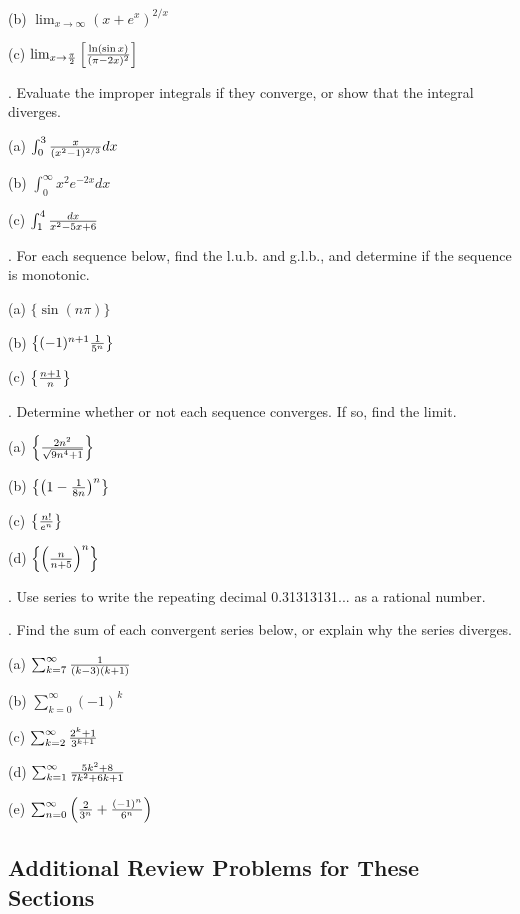 \documentclass[12pt]{article}
\begin{document}
\noindent (b) $\lim_{x \to \infty} (x + e^x)^{2/x}$

\noindent (c) $\lim_{x \to {{\pi}\over{2}}} \left [ {{\ln (\sin x)}\over{(\pi - 
2x)^2}} \right ]$

\bigskip
{}.  Evaluate the improper integrals if they converge, or show 
that the integral diverges.

\noindent (a) $\int_0^3 {{x}\over{(x^2-1)^{2/3}}} dx$

\noindent (b) $\int_0^{\infty} x^2 e^{-2x}dx$

\noindent (c) $\int_1^4 {{dx}\over{x^2-5x+6}}$

\medskip
{}.  For each sequence below, find the l.u.b. and g.l.b., and 
determine if the sequence is monotonic.

\noindent (a) $\{ \sin (n \pi) \}$

\noindent (b) $\left \{ (-1)^{n+1} {{1}\over{5^n}} \right \}$

\noindent (c) $\left \{ {{n+1}\over{n}} \right \}$

\medskip
{}.  Determine whether or not each sequence converges.  If so, find 
the limit.

\noindent (a) $\left \{ {{2n^2}\over{\sqrt{9n^4+1}}} \right \}$ 

\noindent (b) $\left \{ \left ( 1 - {{1}\over{8n}} \right )^n \right \}$ 

\noindent (c) $\left \{ {{n!}\over{e^n}} \right \}$

\noindent (d) $\left \{ \left ( {{n}\over{n+5}} \right )^n \right \}$

\medskip
{}.  Use series to write the repeating decimal 0.31313131... as a 
rational number.

\medskip
{}. Find the sum of each convergent series below, or explain why 
the series diverges.

\noindent (a) $\sum_{k=7}^{\infty} {{1}\over{(k-3)(k+1)}}$ 

\smallskip
\noindent (b) $\sum_{k=0}^{\infty} (-1)^k$

\smallskip
\noindent (c) $\sum_{k=2}^{\infty} {{2^k + 1}\over{3^{k+1}}}$

\smallskip
\noindent (d) $\sum_{k=1}^{\infty} {{5k^2+8}\over{7k^2+6k+1}}$

\smallskip
\noindent (e) $\sum_{n=0}^{\infty} \left ( {{2}\over{3^n}} + {{(-1)^n}\over{6^n}} 
\right )$

\subsection*{Additional Review Problems for These Sections}
\end{document}
